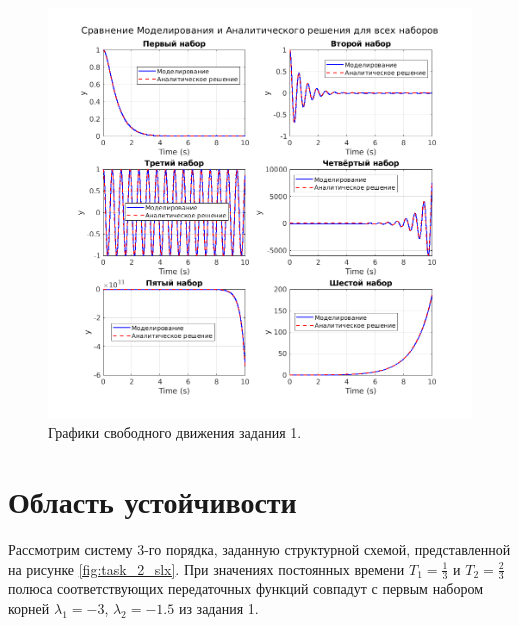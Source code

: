 \begin{figure}
    \centering
    \includegraphics[width=1\textwidth]{figs/task_1_out.png}
    \caption{Графики свободного движения задания 1.}
    \label{fig:task_1_out}
\end{figure}


\section{Область устойчивости}

Рассмотрим систему 3-го порядка, заданную структурной схемой, представленной
на рисунке \ref{fig:task_2_slx}. При значениях постоянных 
времени $T_1=\frac{1}{3}$ и $T_2=\frac{2}{3}$ полюса соответствующих передаточных функций совпадут 
с первым набором корней $\lambda_1=-3$, $\lambda_2=-1.5$ из задания 1.

